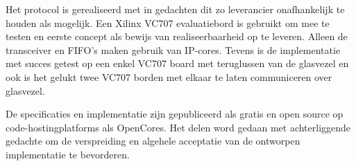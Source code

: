 Het protocol is gerealiseerd met in gedachten dit zo leverancier onafhankelijk te houden als mogelijk. Een Xilinx VC707 evaluatiebord is gebruikt om mee te testen en eerste concept als bewijs van realiseerbaarheid op te leveren. Alleen de transceiver en FIFO's maken gebruik van IP-cores. Tevens is de implementatie met succes getest op een enkel VC707 board met teruglussen van de glasvezel en ook is het gelukt twee VC707 borden met elkaar te laten communiceren over glasvezel.

De specificaties en implementatie zijn gepubliceerd als gratis en open source op code-hostingplatforms als OpenCores. Het delen word gedaan met achterliggende gedachte om de verspreiding en algehele acceptatie van de ontworpen implementatie te bevorderen.

\newpage